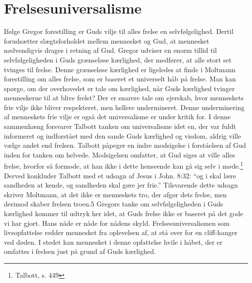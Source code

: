 \section{Frelsesuniversalisme}
Ifølge Gregor forestilling er Guds vilje til alles frelse en selvfølgelighed. Dertil forudsætter slægtsforholdet mellem mennesket og Gud, at mennesket nødvendigvis drages i retning af Gud. Gregor udviser en enorm tillid til selvfølgeligheden i Guds grænseløse kærlighed, der medfører, at alle stort set tvinges til frelse. Denne grænseløse kærlighed er ligeledes at finde i Moltmann forestilling om alles frelse, som er baseret et universelt håb på frelse. Man kan spørge, om der overhovedet er tale om kærlighed, når Guds kærlighed tvinger menneskerne til at blive frelst? Der er snarere tale om ejerskab, hvor menneskets frie vilje ikke bliver respekteret, men hellere undermineret. Denne underminering af menneskets frie vilje er også det universalisme er under kritik for. I denne sammenhæng forsvarer Talbott tanken om universalisme idet en, der var fuldt informeret og indforstået med den sande Guds kærlighed og visdom, aldrig ville vælge andet end frelsen. Talbott påpeger en indre modsigelse i forståelsen af Gud inden for tanken om helvede. Modsigelsen omfatter, at Gud siges at ville alles frelse, hvorfor så formode, at han ikke i dette henseende kan gå sig selv i møde.\footnote{Talbott, s. 449} Derved konkluder Talbott med et udsagn af Jesus i John. 8:32: “og i skal lære sandheden at kende, og sandheden skal gøre jer frie.” Tilsvarende dette udsagn skriver Moltmann, at det ikke er menneskets tro, der afgør dets frelse, men derimod skaber frelsen troen.5 Gregors tanke om selvfølgeligheden i Guds kærlighed kommer til udtryk her idet, at Guds frelse ikke er baseret på det gode vi har gjort. Hans nåde er nåde for nådens skyld. Frelsesuniversalismen som livsopfattelse redder mennesket fra oplevelsen af, at stå over for en cliff-hanger ved døden. I stedet kan mennesket i denne opfattelse hvile i håbet, der er omfattes i frelsen just på grund af Guds kærlighed.

